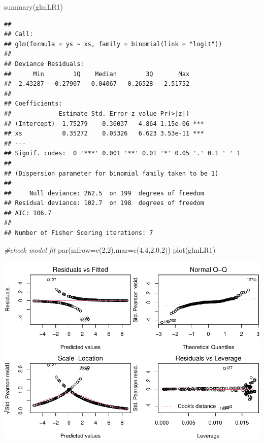 \documentclass[
]{book}
\newenvironment{Shaded}{\begin{snugshade}}{\end{snugshade}}
\newcommand{\AttributeTok}[1]{\textcolor[rgb]{0.77,0.63,0.00}{#1}}
\newcommand{\CommentTok}[1]{\textcolor[rgb]{0.56,0.35,0.01}{\textit{#1}}}
\newcommand{\DecValTok}[1]{\textcolor[rgb]{0.00,0.00,0.81}{#1}}
\newcommand{\FloatTok}[1]{\textcolor[rgb]{0.00,0.00,0.81}{#1}}
\newcommand{\FunctionTok}[1]{\textcolor[rgb]{0.00,0.00,0.00}{#1}}
\newcommand{\NormalTok}[1]{#1}
\begin{document}
\begin{Shaded}
\begin{Highlighting}[]
\FunctionTok{summary}\NormalTok{(glmLR1)}
\end{Highlighting}
\end{Shaded}

\begin{verbatim}
## 
## Call:
## glm(formula = ys ~ xs, family = binomial(link = "logit"))
## 
## Deviance Residuals: 
##      Min        1Q    Median        3Q       Max  
## -2.43287  -0.27907   0.04067   0.26528   2.51752  
## 
## Coefficients:
##             Estimate Std. Error z value Pr(>|z|)    
## (Intercept)  1.75279    0.36037   4.864 1.15e-06 ***
## xs           0.35272    0.05326   6.623 3.53e-11 ***
## ---
## Signif. codes:  0 '***' 0.001 '**' 0.01 '*' 0.05 '.' 0.1 ' ' 1
## 
## (Dispersion parameter for binomial family taken to be 1)
## 
##     Null deviance: 262.5  on 199  degrees of freedom
## Residual deviance: 102.7  on 198  degrees of freedom
## AIC: 106.7
## 
## Number of Fisher Scoring iterations: 7
\end{verbatim}

\begin{Shaded}
\begin{Highlighting}[]
\CommentTok{\#check model fit}
\FunctionTok{par}\NormalTok{(}\AttributeTok{mfrow=}\FunctionTok{c}\NormalTok{(}\DecValTok{2}\NormalTok{,}\DecValTok{2}\NormalTok{),}\AttributeTok{mar=}\FunctionTok{c}\NormalTok{(}\DecValTok{4}\NormalTok{,}\DecValTok{4}\NormalTok{,}\DecValTok{2}\NormalTok{,}\FloatTok{0.2}\NormalTok{))}
\FunctionTok{plot}\NormalTok{(glmLR1)}
\end{Highlighting}
\end{Shaded}

\includegraphics{ECOMODbook_files/figure-latex/unnamed-chunk-17-2.pdf}
\end{document}
